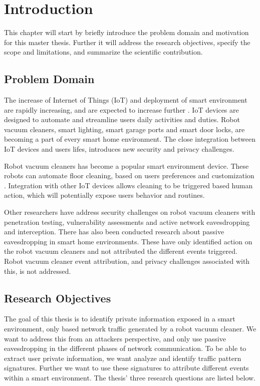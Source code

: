 \chapter{Introduction}

 This chapter will start by briefly introduce the problem domain and motivation for this master thesis. Further it will address the research objectives, specify the scope and limitations, and summarize the scientific contribution.  
 
\section{Problem Domain}

The increase of Internet of Things (IoT) and deployment of smart environment are rapidly increasing, and are expected to increase further \cite{iotgrowth}. IoT 
devices are designed to automate and streamline users daily activities and duties. Robot vacuum cleaners, smart lighting, smart garage ports and smart door locks, are becoming a part of every smart home environment. The close integration between IoT devices and users lifes, introduces new security and privacy challenges.

Robot vacuum cleaners has become a popular smart environment device. These robots can automate floor cleaning, based on users preferences and customization \cite{roboticvacuumcleaner2021}. Integration with other IoT devices allows cleaning to be triggered based human action, which will potentially expose users behavior and routines. 

Other researchers have address security challenges on robot vacuum cleaners with penetration testing, vulnerability assessments and active network eavesdropping and interception. There has also been conducted research about passive eavesdropping in smart home environments. These have only identified action on the robot vacuum cleaners and not attributed the different events triggered. Robot vacuum cleaner event attribution, and privacy challenges associated with this, is not addressed.

\section{Research Objectives}

The goal of this thesis is to identify private information exposed in a smart environment, only based network traffic generated by a robot vacuum cleaner. We want to address this from an attackers perspective, and only use passive eavesdropping in the different phases of network communication. To be able to extract user private information, we want analyze and identify traffic pattern signatures. Further we want to use these signatures to attribute different events within a smart environment. The thesis' three research questions are listed below. 

